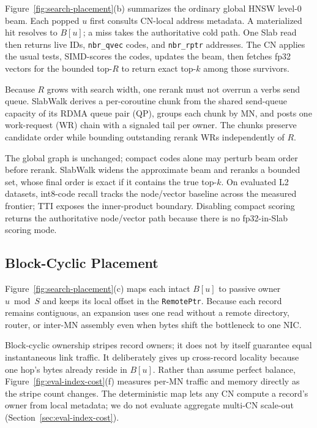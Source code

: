 \documentclass[sigconf,nonacm]{acmart}
\begin{document}
Figure~\ref{fig:search-placement}(b) summarizes the ordinary global HNSW
level-0 beam.  Each popped $u$ first consults CN-local address metadata.  A
materialized hit resolves to $B[u]$; a miss takes the authoritative cold path.
One Slab read then returns live IDs, \texttt{nbr\_qvec} codes, and
\texttt{nbr\_rptr} addresses.  The CN applies the usual tests, SIMD-scores the
codes, updates the beam, then fetches fp32 vectors for the bounded top-$R$ to
return exact top-$k$ among those survivors.

Because $R$ grows with search width, one rerank must not overrun a verbs send
queue.  SlabWalk derives a per-coroutine chunk from the shared send-queue
capacity of its RDMA queue pair (QP), groups each chunk by MN, and posts one
work-request (WR) chain with a signaled tail per owner.  The chunks preserve
candidate order while bounding outstanding rerank WRs independently of $R$.

The global graph is unchanged; compact codes alone may perturb beam order
before rerank.  SlabWalk widens the approximate beam and reranks a bounded set,
whose final order is exact if it contains the true top-$k$.  On evaluated L2
datasets, int8-code recall tracks the node/vector baseline across the measured
frontier; TTI exposes the inner-product boundary.  Disabling compact
scoring returns the authoritative node/vector path because there is no
fp32-in-Slab scoring mode.

\subsection{Block-Cyclic Placement}
\label{sec:serving}

Figure~\ref{fig:search-placement}(c) maps each intact $B[u]$ to passive owner
$u\bmod S$ and keeps its local offset in the \texttt{RemotePtr}.  Because each
record remains contiguous, an expansion uses one read without a remote directory,
router, or inter-MN assembly even when bytes shift the bottleneck to one NIC\@.

Block-cyclic ownership stripes record owners; it does not by itself guarantee
equal instantaneous link traffic.  It deliberately gives up cross-record
locality because one hop's bytes already reside in $B[u]$.  Rather than assume
perfect balance, Figure~\ref{fig:eval-index-cost}(f) measures per-MN traffic and
memory directly as the stripe count changes.  The deterministic map lets any CN
compute a record's owner from local metadata; we do not evaluate aggregate
multi-CN scale-out (Section~\ref{sec:eval-index-cost}).
\end{document}
